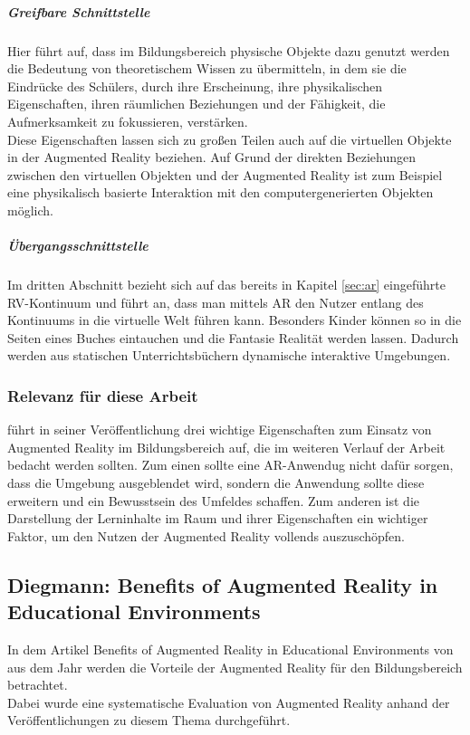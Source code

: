 \subparagraph{Greifbare Schnittstelle}
Hier führt \citeauthor{billinghurst:ar-in-education} auf, dass im Bildungsbereich physische Objekte dazu genutzt werden die Bedeutung von theoretischem Wissen zu übermitteln, in dem sie die Eindrücke des Schülers, durch ihre Erscheinung, ihre physikalischen Eigenschaften, ihren räumlichen Beziehungen und der Fähigkeit, die Aufmerksamkeit zu fokussieren, verstärken.\\
Diese Eigenschaften lassen sich zu großen Teilen auch auf die virtuellen Objekte in der Augmented Reality beziehen. Auf Grund der direkten Beziehungen zwischen den virtuellen Objekten und der Augmented Reality ist zum Beispiel eine physikalisch basierte Interaktion mit den computergenerierten Objekten möglich. \citep[S. 3]{billinghurst:ar-in-education}

\subparagraph{Übergangsschnittstelle}
Im dritten Abschnitt bezieht sich \citeauthor{billinghurst:ar-in-education} auf das bereits in Kapitel \ref{sec:ar} eingeführte RV-Kontinuum und führt an, dass man mittels AR den Nutzer entlang des Kontinuums in die virtuelle Welt führen kann. Besonders Kinder können so in die Seiten eines Buches eintauchen und die Fantasie Realität werden lassen. Dadurch werden aus statischen Unterrichtsbüchern dynamische interaktive Umgebungen. \citep[S. 3-4]{billinghurst:ar-in-education}

\subsubsection{Relevanz für diese Arbeit}
\citeauthor{billinghurst:ar-in-education} führt in seiner Veröffentlichung drei wichtige Eigenschaften zum Einsatz von Augmented Reality im Bildungsbereich auf, die im weiteren Verlauf der Arbeit bedacht werden sollten. Zum einen sollte eine AR-Anwendug nicht dafür sorgen, dass die Umgebung ausgeblendet wird, sondern die Anwendung sollte diese erweitern und ein Bewusstsein des Umfeldes schaffen. Zum anderen ist die Darstellung der Lerninhalte im Raum und ihrer Eigenschaften ein wichtiger Faktor, um den Nutzen der Augmented Reality vollends auszuschöpfen. 


\subsection{Diegmann: Benefits of Augmented Reality in Educational Environments}\label{sec:diegmann-benefits-ar}
In dem Artikel \glqq  Benefits of Augmented Reality in Educational Environments\grqq{} von \citeauthor{diegmann:benefits-ar} aus dem Jahr  \citeyear{diegmann:benefits-ar} werden die Vorteile der Augmented Reality für den Bildungsbereich betrachtet. \\
Dabei wurde eine systematische Evaluation von Augmented Reality anhand der Veröffentlichungen zu diesem Thema durchgeführt.

